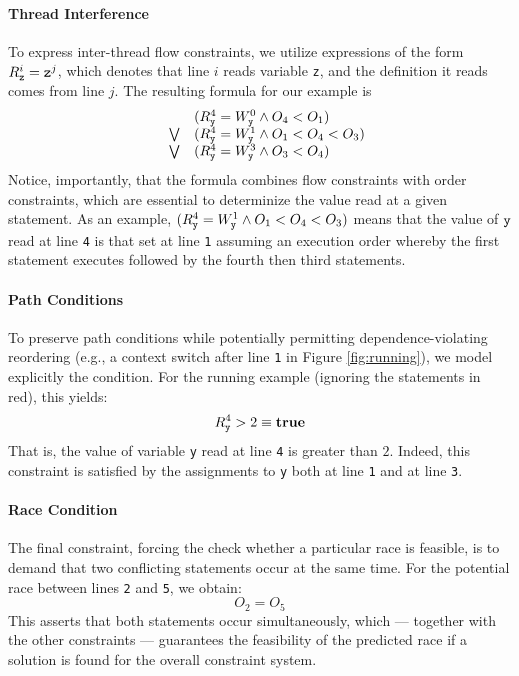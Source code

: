 \paragraph{Thread Interference} To express inter-thread flow constraints, we utilize expressions of the form $R_{\tt z}^i={\tt z}^j$, which denotes that line $i$ reads variable {\tt z}, and the definition it reads comes from line $j$. The resulting formula for our example is
$$
\begin{array}{lcl}
	& & (R_{\tt y}^4=W_{\tt y}^0 \wedge O_4 < O_1)  \\
& \bigvee &
	(R_{\tt y}^4=W_{\tt y}^1 \wedge O_1 < O_4 < O_3) \\
& \bigvee &
	(R_{\tt y}^4=W_{\tt y}^3 \wedge O_3 < O_4)
\end{array}
$$    
Notice, importantly, that the formula combines flow constraints with order constraints, which are essential to determinize the value read at a given statement. As an example, 
$(R_{\tt y}^4=W_{\tt y}^1 \wedge O_1 < O_4 < O_3)$ means that the value of ${\tt y}$ read at 
line {\tt 4} is that set at line {\tt 1} assuming an execution order whereby the first statement executes followed by the fourth then third statements. 

\paragraph{Path Conditions} To preserve path conditions while potentially permitting dependence-violating reordering (e.g., a context switch after line {\tt 1} in Figure \ref{fig:running}), we model explicitly the condition. For the running example (ignoring the statements in red), this yields:
$$
	R_{\tt y}^4 > 2 \equiv {\bf true}
$$
That is, the value of variable {\tt y} read at line {\tt 4} is greater than $2$. Indeed, this constraint is satisfied by the assignments to {\tt y} both at line {\tt 1} and at line {\tt 3}.

\paragraph{Race Condition} The final constraint, forcing the check whether a particular race is feasible, is to demand that two conflicting statements occur at the same time. For the potential race between lines {\tt 2} and {\tt 5}, we obtain:
$$
	O_2 = O_5
$$ 
This asserts that both statements occur simultaneously, which --- together with the other constraints --- guarantees the feasibility of the predicted race if a solution is found for the overall constraint system.

